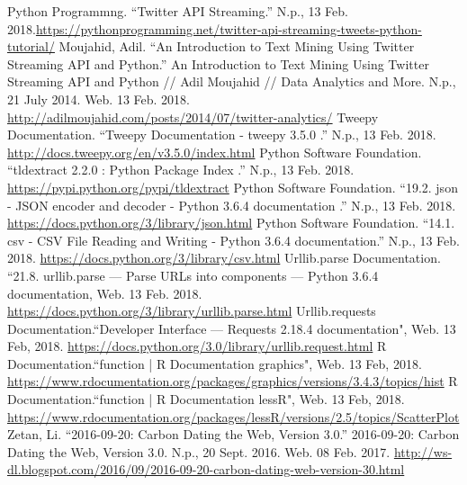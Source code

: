 \documentclass[letterpaper,11pt]{article}
\begin{document}
\begin{thebibliography}{9}
Python Programmng. ``Twitter API Streaming.''  N.p., 13 Feb. 2018.\url{https://pythonprogramming.net/twitter-api-streaming-tweets-python-tutorial/}
Moujahid, Adil. ``An Introduction to Text Mining Using Twitter Streaming API and Python.'' An Introduction to Text Mining Using Twitter Streaming API and Python // Adil Moujahid // Data Analytics and More. N.p., 21 July 2014. Web. 13 Feb. 2018. \url{http://adilmoujahid.com/posts/2014/07/twitter-analytics/}
Tweepy Documentation. ``Tweepy Documentation - tweepy 3.5.0 .''  N.p., 13 Feb. 2018. \url{http://docs.tweepy.org/en/v3.5.0/index.html}
Python Software Foundation. ``tldextract 2.2.0 : Python Package Index .''  N.p., 13 Feb. 2018. \url{https://pypi.python.org/pypi/tldextract}
Python Software Foundation. ``19.2. json - JSON encoder and decoder - Python 3.6.4 documentation .''  N.p., 13 Feb. 2018. \url{https://docs.python.org/3/library/json.html}
Python Software Foundation. ``14.1. csv - CSV File Reading and Writing - Python 3.6.4 documentation.''  N.p., 13 Feb. 2018. \url{https://docs.python.org/3/library/csv.html}
Urllib.parse Documentation. ``21.8. urllib.parse — Parse URLs into components — Python 3.6.4 documentation, Web. 13 Feb. 2018. \url{https://docs.python.org/3/library/urllib.parse.html}
 Urllib.requests Documentation.``Developer Interface — Requests 2.18.4 documentation", Web. 13 Feb, 2018. \url{https://docs.python.org/3.0/library/urllib.request.html}
 R Documentation.``function | R Documentation graphics", Web. 13 Feb, 2018. \url{https://www.rdocumentation.org/packages/graphics/versions/3.4.3/topics/hist}
 R Documentation.``function | R Documentation lessR", Web. 13 Feb, 2018. \url{https://www.rdocumentation.org/packages/lessR/versions/2.5/topics/ScatterPlot}
Zetan, Li. ``2016-09-20: Carbon Dating the Web, Version 3.0.'' 2016-09-20: Carbon Dating the Web, Version 3.0. N.p., 20 Sept. 2016. Web. 08 Feb. 2017. \url{http://ws-dl.blogspot.com/2016/09/2016-09-20-carbon-dating-web-version-30.html}
\end{thebibliography}
\end{document}
